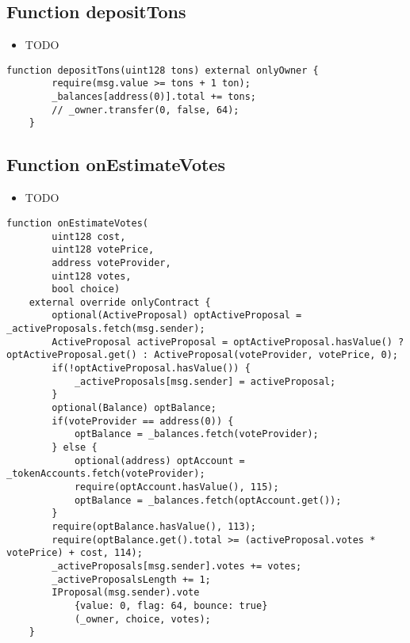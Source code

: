 \subsection{Function depositTons}

\begin{itemize}
\item TODO
\end{itemize}

\begin{lstlisting}[firstnumber=204]
    function depositTons(uint128 tons) external onlyOwner {
        require(msg.value >= tons + 1 ton);
        _balances[address(0)].total += tons;
        // _owner.transfer(0, false, 64);
    }
\end{lstlisting}

\subsection{Function onEstimateVotes}

\begin{itemize}
\item TODO
\end{itemize}

\begin{lstlisting}[firstnumber=60]
    function onEstimateVotes(
        uint128 cost,
        uint128 votePrice,
        address voteProvider,
        uint128 votes,
        bool choice)
    external override onlyContract {
        optional(ActiveProposal) optActiveProposal = _activeProposals.fetch(msg.sender);
        ActiveProposal activeProposal = optActiveProposal.hasValue() ? optActiveProposal.get() : ActiveProposal(voteProvider, votePrice, 0);
        if(!optActiveProposal.hasValue()) {
            _activeProposals[msg.sender] = activeProposal;
        }
        optional(Balance) optBalance;
        if(voteProvider == address(0)) {
            optBalance = _balances.fetch(voteProvider);
        } else {
            optional(address) optAccount = _tokenAccounts.fetch(voteProvider);
            require(optAccount.hasValue(), 115);
            optBalance = _balances.fetch(optAccount.get());
        }
        require(optBalance.hasValue(), 113);
        require(optBalance.get().total >= (activeProposal.votes * votePrice) + cost, 114);
        _activeProposals[msg.sender].votes += votes;
        _activeProposalsLength += 1;
        IProposal(msg.sender).vote
            {value: 0, flag: 64, bounce: true}
            (_owner, choice, votes);
    }
\end{lstlisting}

